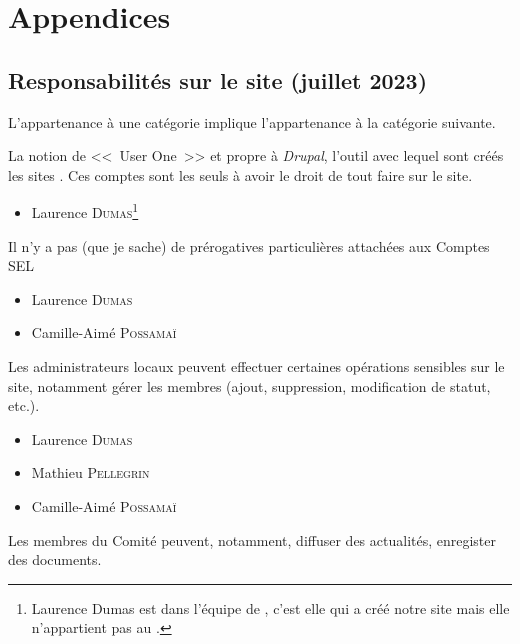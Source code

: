 \chapter{Appendices}

\section[Responsabilités sur le site]{Responsabilités sur le site (juillet 2023)}\label{sec:responsabilitesSite}

L'appartenance à une catégorie implique l'appartenance à la catégorie suivante.


La notion de <<~User One~>> et propre à \emph{Drupal}, l'outil avec lequel sont créés les sites \CF. Ces comptes sont les seuls à avoir le droit de tout faire sur le site.

\begin{itemize}
    \item Laurence \textsc{Dumas}\footnote{Laurence Dumas est dans l'équipe de \CF, c'est elle qui a créé notre site mais elle n'appartient pas au \CdS.}
\end{itemize}

\label{sec:comptesSel}

Il n'y a pas (que je sache) de prérogatives particulières attachées aux Comptes SEL

\begin{itemize}
    \item Laurence \textsc{Dumas}
    \item Camille-Aimé \textsc{Possamaï}
\end{itemize}

\label{sec:adminLocal}

Les administrateurs locaux peuvent effectuer certaines opérations sensibles sur le site, notamment gérer les membres (ajout, suppression, modification de statut, etc.).

\begin{itemize}
    \item Laurence \textsc{Dumas}
    \item Mathieu \textsc{Pellegrin}
    \item Camille-Aimé \textsc{Possamaï}
\end{itemize}

\label{sec:comite}

Les membres du Comité peuvent, notamment, diffuser des actualités, enregister des documents.

